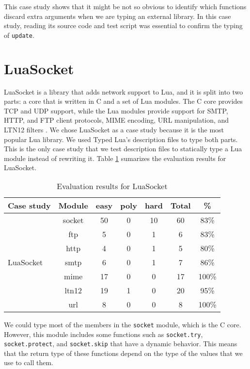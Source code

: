 This case study shows that it might be not so obvious to identify which
functions discard extra arguments when we are typing an external library.
In this case study, reading its source code and test script was essential
to confirm the typing of \texttt{update}.

\section{LuaSocket}

LuaSocket \citep{luasocket} is a library that adds network support to Lua,
and it is split into two parts: a core that is written in C and a set of
Lua modules.
The C core provides TCP and UDP support, while the Lua modules provide
support for SMTP, HTTP, and FTP client protocols, MIME encoding,
URL manipulation, and LTN12 filters \citep{nehab2008ltn012}.
We chose LuaSocket as a case study because it is the most popular Lua library.
We used Typed Lua's description files to type both parts.
This is the only case study that we test description files to statically type
a Lua module instead of rewriting it.
Table \ref{tab:evalsocket} sumarizes the evaluation results for LuaSocket.

\begin{table}[!ht]
\begin{center}
\begin{tabular}{|l|c|c|c|c|c|c|}
\hline
\textbf{Case study} & \textbf{Module} & \textbf{easy} & \textbf{poly} & \textbf{hard} & \textbf{Total} & \textbf{\%} \\
\hline
\multirow{7}{*}{LuaSocket}
& socket & 50 & 0 & 10 & 60 & 83\% \\
\cline{2-7}
& ftp & 5 & 0 & 1 & 6 & 83\% \\
\cline{2-7}
& http & 4 & 0 & 1 & 5 & 80\% \\
\cline{2-7}
& smtp & 6 & 0 & 1 & 7 & 86\% \\
\cline{2-7}
& mime & 17 & 0 & 0 & 17 & 100\% \\
\cline{2-7}
& ltn12 & 19 & 1 & 0 & 20 & 95\% \\
\cline{2-7}
& url & 8 & 0 & 0 & 8 & 100\% \\
\hline
\end{tabular}
\end{center}
\caption{Evaluation results for LuaSocket}
\label{tab:evalsocket}
\end{table}

We could type most of the members in the \texttt{socket} module,
which is the C core.
However, this module includes some functions such as
\texttt{socket.try}, \texttt{socket.protect}, and \texttt{socket.skip}
that have a dynamic behavior.
This means that the return type of these functions depend on the
type of the values that we use to call them.

